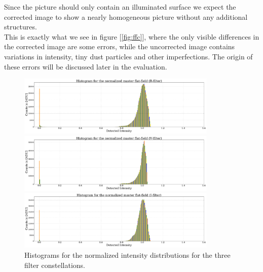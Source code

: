 Since the picture should only contain an illuminated surface we expect the corrected image to show a nearly homogeneous picture without any additional structures. \\
This is exactly what we see in figure [\ref{fig:ffc}], where the only visible differences in the corrected image are some errors, 
while the uncorrected image contains variations in intensity, tiny dust particles and other imperfections. 
The origin of these errors will be discussed later in the evaluation.\\

\begin{figure}[H]
	
	\begin{minipage}{\textwidth}
		\centering
		\includegraphics[width = 0.85\textwidth]{figures/Plots/histR}
	\end{minipage}
	\begin{minipage}{\textwidth}
		\centering
		\includegraphics[width = 0.85\textwidth]{figures/Plots/histV}
	\end{minipage}
	\begin{minipage}{\textwidth}
		\centering
		\includegraphics[width = 0.85\textwidth]{figures/Plots/histI}
	\end{minipage}
	\caption{Histograms for the normalized intensity distributions for the three filter constellations.}
	\label{fig:histograms}
\end{figure} 

